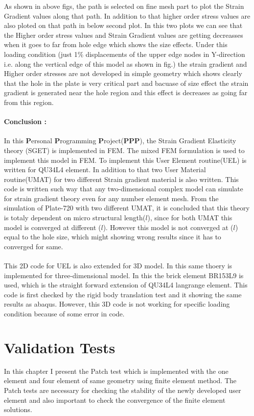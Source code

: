 \documentclass[12pt]{article}
\begin{document}
\newpage
As shown in above figs, the path is selected on fine mesh part to plot the Strain Gradient values along that path. In addition to that higher order stress values are also ploted on that path in below second plot. In this two plots we can see that the Higher order stress values and Strain Gradient values are getting decreasses when it goes to far from hole edge which shows the size effects. Under this loading condition (just 1$\%$ displacements of the upper edge nodes in Y-direction i.e. along the vertical edge of this model as shown in fig.) the strain gradient and Higher order stresses are not developed in simple geometry which shows clearly that the hole in the plate is very critical part and bacuase of size effect the strain gradient is generated near the hole region and this effect is decreases as going far from this region.
\\
\\
\textbf{Conclusion :} \\
\\
In this \textbf{P}ersonal \textbf{P}rogramming \textbf{P}roject(\textbf{PPP}), the Strain Gradient Elasticity theory (SGET) is implemented in FEM. The mixed FEM formulation is used to implement this model in FEM. To implement this User Element routine(UEL) is written for QU34L4 element. In addition to that two User Material routine(UMAT) for two different Strain gradient material is also written. This code is written such way that any two-dimensional complex model can simulate for strain gradient theory even for any number element mesh. From the simulation of Plate-720 with two different UMAT, it is concluded that this theory is totaly dependent on micro structural length($ l $), since for both UMAT this model is converged at different ($ l $). However this model is not converged at ($ l $) equal to the hole size, which might showing wrong results since it has to converged for same. \\
\\
This 2D code for UEL is also extended for 3D model. In this same thoery is implemented for three-dimensional model. In this the brick element BR153L9 is used, which is the straight forward extension of QU34L4 langrange element. This code is first checked by the rigid body translation test and it showing the same results as abaqus. However, this 3D code is not working for specific loading condition because of some error in code. 



\newpage
\section{Validation Tests}
In this chapter I present the Patch test which is implemented with the one element and four element of same geometry using finite element method. The Patch tests are necessary for checking the stability of the newly developed user element and also important to check the convergence of the finite element solutions.  
\end{document}

